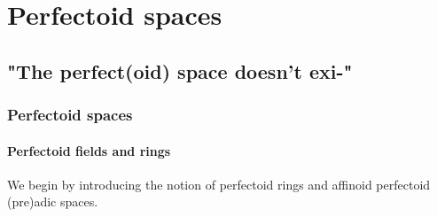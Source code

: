 \chapter{Perfectoid spaces}
    \begin{abstract}
        
    \end{abstract}
    
    \section{"The perfect(oid) space doesn't exi-"} \label{section: perfectoid_spaces}
        \subsection{Perfectoid spaces}
            \subsubsection{Perfectoid fields and rings}
                We begin by introducing the notion of perfectoid rings and affinoid perfectoid (pre)adic spaces.
            
